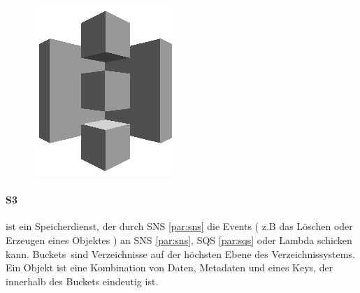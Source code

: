 \documentclass[
12pt,
english,
ngerman,
headsepline,
twoside,
openright,
numbers=noenddot,version=first
]{scrreprt}
\begin{document}
\begin{figure}
	\includegraphics[width=0.9\linewidth]{./pics/aws/Storage_GRAYSCALE_AmazonS3.eps}
\end{figure}
\paragraph{\acrfull{S3}} ist ein Speicherdienst, der durch \acrshort{SNS} \autoref{par:sns} die Events ( z.B das Löschen oder Erzeugen eines Objektes ) an \acrshort{SNS}  \autoref{par:sns}, \acrfull{SQS} \autoref{par:sqs} oder Lambda schicken kann. \glqq Buckets\grqq\ sind Verzeichnisse auf der höchsten Ebene des Verzeichnissystems. Ein Objekt ist eine Kombination von Daten, Metadaten und eines Keys, der innerhalb des Buckets eindeutig ist.
\end{document}
